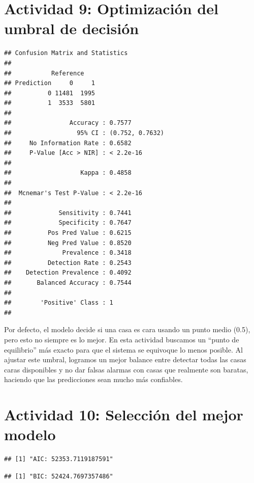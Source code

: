 \documentclass[
]{article}
\begin{document}
\section{Actividad 9: Optimización del umbral de
decisión}\label{actividad-9-optimizaciuxf3n-del-umbral-de-decisiuxf3n}

\begin{verbatim}
## Confusion Matrix and Statistics
## 
##           Reference
## Prediction     0     1
##          0 11481  1995
##          1  3533  5801
##                                          
##                Accuracy : 0.7577         
##                  95% CI : (0.752, 0.7632)
##     No Information Rate : 0.6582         
##     P-Value [Acc > NIR] : < 2.2e-16      
##                                          
##                   Kappa : 0.4858         
##                                          
##  Mcnemar's Test P-Value : < 2.2e-16      
##                                          
##             Sensitivity : 0.7441         
##             Specificity : 0.7647         
##          Pos Pred Value : 0.6215         
##          Neg Pred Value : 0.8520         
##              Prevalence : 0.3418         
##          Detection Rate : 0.2543         
##    Detection Prevalence : 0.4092         
##       Balanced Accuracy : 0.7544         
##                                          
##        'Positive' Class : 1              
## 
\end{verbatim}

Por defecto, el modelo decide si una casa es cara usando un punto medio
(0.5), pero esto no siempre es lo mejor. En esta actividad buscamos un
``punto de equilibrio'' más exacto para que el sistema se equivoque lo
menos posible. Al ajustar este umbral, logramos un mejor balance entre
detectar todas las casas caras disponibles y no dar falsas alarmas con
casas que realmente son baratas, haciendo que las predicciones sean
mucho más confiables.

\section{Actividad 10: Selección del mejor
modelo}\label{actividad-10-selecciuxf3n-del-mejor-modelo}

\begin{verbatim}
## [1] "AIC: 52353.7119187591"
\end{verbatim}

\begin{verbatim}
## [1] "BIC: 52424.7697357486"
\end{verbatim}
\end{document}

